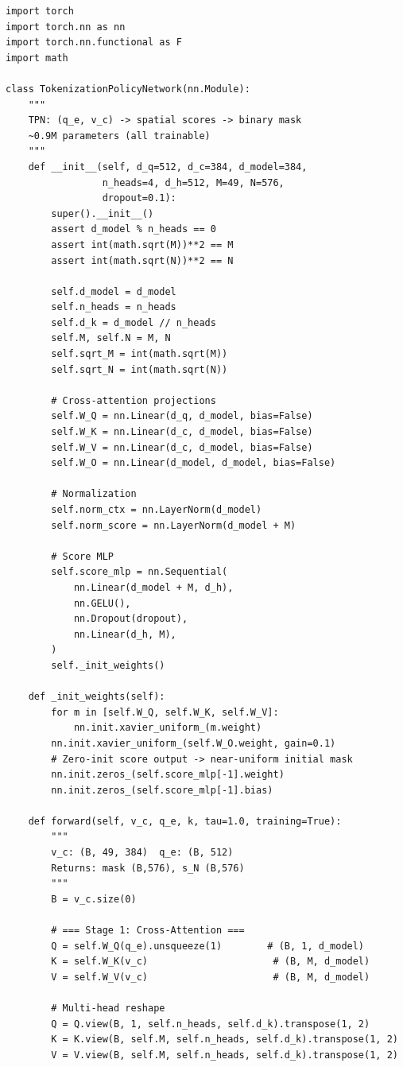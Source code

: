 \documentclass[11pt,a4paper]{article}
\begin{document}
\begin{lstlisting}[caption={TokenizationPolicyNetwork: full
  implementation.}]
import torch
import torch.nn as nn
import torch.nn.functional as F
import math

class TokenizationPolicyNetwork(nn.Module):
    """
    TPN: (q_e, v_c) -> spatial scores -> binary mask
    ~0.9M parameters (all trainable)
    """
    def __init__(self, d_q=512, d_c=384, d_model=384,
                 n_heads=4, d_h=512, M=49, N=576,
                 dropout=0.1):
        super().__init__()
        assert d_model % n_heads == 0
        assert int(math.sqrt(M))**2 == M
        assert int(math.sqrt(N))**2 == N

        self.d_model = d_model
        self.n_heads = n_heads
        self.d_k = d_model // n_heads
        self.M, self.N = M, N
        self.sqrt_M = int(math.sqrt(M))
        self.sqrt_N = int(math.sqrt(N))

        # Cross-attention projections
        self.W_Q = nn.Linear(d_q, d_model, bias=False)
        self.W_K = nn.Linear(d_c, d_model, bias=False)
        self.W_V = nn.Linear(d_c, d_model, bias=False)
        self.W_O = nn.Linear(d_model, d_model, bias=False)

        # Normalization
        self.norm_ctx = nn.LayerNorm(d_model)
        self.norm_score = nn.LayerNorm(d_model + M)

        # Score MLP
        self.score_mlp = nn.Sequential(
            nn.Linear(d_model + M, d_h),
            nn.GELU(),
            nn.Dropout(dropout),
            nn.Linear(d_h, M),
        )
        self._init_weights()

    def _init_weights(self):
        for m in [self.W_Q, self.W_K, self.W_V]:
            nn.init.xavier_uniform_(m.weight)
        nn.init.xavier_uniform_(self.W_O.weight, gain=0.1)
        # Zero-init score output -> near-uniform initial mask
        nn.init.zeros_(self.score_mlp[-1].weight)
        nn.init.zeros_(self.score_mlp[-1].bias)

    def forward(self, v_c, q_e, k, tau=1.0, training=True):
        """
        v_c: (B, 49, 384)  q_e: (B, 512)
        Returns: mask (B,576), s_N (B,576)
        """
        B = v_c.size(0)

        # === Stage 1: Cross-Attention ===
        Q = self.W_Q(q_e).unsqueeze(1)        # (B, 1, d_model)
        K = self.W_K(v_c)                      # (B, M, d_model)
        V = self.W_V(v_c)                      # (B, M, d_model)

        # Multi-head reshape
        Q = Q.view(B, 1, self.n_heads, self.d_k).transpose(1, 2)
        K = K.view(B, self.M, self.n_heads, self.d_k).transpose(1, 2)
        V = V.view(B, self.M, self.n_heads, self.d_k).transpose(1, 2)


\end{lstlisting}
\end{document}
